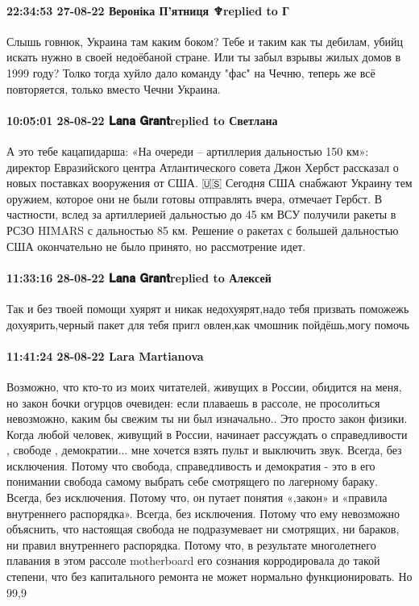 \paragraph{22:34:53 27-08-22 Вероніка П’ятниця ♆replied to Г}

Слышь говнюк, Украина там каким боком? Тебе и таким как ты дебилам, убийц
искать нужно в своей недоёбаной стране. Или ты забыл взрывы жилых домов в 1999
году? Толко тогда хуйло дало команду "фас" на Чечню, теперь же всё повторяется,
только вместо Чечни Украина.

\paragraph{10:05:01 28-08-22 𝐋𝐚𝐧𝐚 𝐆𝐫𝐚𝐧𝐭replied to Светлана}

А это тебе кацапидарша:
«На очереди – артиллерия дальностью 150 км»: директор Евразийского центра Атлантического совета Джон Хербст рассказал о новых поставках вооружения от США. 🇺🇸
Сегодня США снабжают Украину тем оружием, которое они не были готовы отправлять вчера, отмечает Гербст. В частности, вслед за артиллерией дальностью до 45 км ВСУ получили ракеты в РСЗО HIMARS с дальностью 85 км. Решение о ракетах с большей дальностью США окончательно не было принято, но рассмотрение идет.

\paragraph{11:33:16 28-08-22 𝐋𝐚𝐧𝐚 𝐆𝐫𝐚𝐧𝐭replied to Алексей}

Так и без твоей помощи хуярят и никак недохуярят,надо тебя призвать поможежь
дохуярить,черный пакет для тебя пригл овлен,как чмошник пойдёшь,могу помочь

\paragraph{11:41:24 28-08-22 Lara Martianova}

Возможно, что кто-то из моих читателей, живущих в России, обидится на меня, но закон бочки огурцов очевиден: если плаваешь в рассоле, не просолиться невозможно, каким бы свежим ты ни был изначально..
Это просто закон физики.
Когда любой человек, живущий в России, начинает рассуждать о справедливости , свободе , демократии... мне хочется взять пульт и выключить звук. Всегда, без исключения.
Потому что свобода, справедливость и демократия - это в его понимании свобода самому выбрать себе смотрящего по лагерному бараку. Всегда, без исключения.
Потому что, он путает понятия «,закон» и «правила внутреннего распорядка». Всегда, без исключения.
Потому что ему невозможно объяснить, что настоящая свобода не подразумевает ни смотрящих, ни бараков, ни правил внутреннего распорядка.
Потому что, в результате многолетнего плавания в этом рассоле motherboard его сознания корродировала до такой степени, что без капитального ремонта не может нормально функционировать. Но 99,9%


